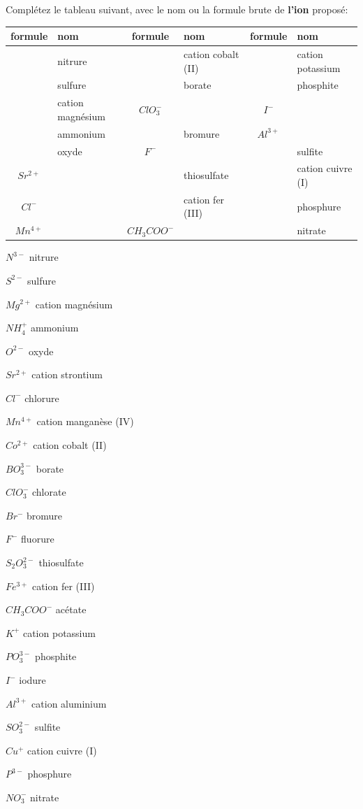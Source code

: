 \documentclass[
  11pt,
  french,
  a4paper,
  openany]{book}
\begin{document}
\begin{Exercise}
Complétez le tableau suivant, avec le nom ou la formule brute de \textbf{l'ion} proposé:

\end{Exercise}

\begin{longtable}[]{@{}clclcl@{}}
\toprule
formule & nom & formule & nom & formule & nom\tabularnewline
\midrule
\endhead
& nitrure & & cation cobalt (II) & & cation potassium\tabularnewline
& sulfure & & borate & & phosphite\tabularnewline
& cation magnésium & \(ClO_3^{-}\) & & \(I^{-}\) &\tabularnewline
& ammonium & & bromure & \(Al^{3+}\) &\tabularnewline
& oxyde & \(F^{-}\) & & & sulfite\tabularnewline
\(Sr^{2+}\) & & & thiosulfate & & cation cuivre (I)\tabularnewline
\(Cl^{-}\) & & & cation fer (III) & & phosphure\tabularnewline
\(Mn^{4+}\) & & \(CH_3COO^{-}\) & & & nitrate\tabularnewline
\bottomrule
\end{longtable}

\begin{Answer}

\begin{multicols}{3}
\(N^{3-}\) nitrure

\(S^{2-}\) sulfure

\(Mg^{2+}\) cation magnésium

\(NH_4^{+}\) ammonium

\(O^{2-}\) oxyde

\(Sr^{2+}\) cation strontium

\(Cl^{-}\) chlorure

\(Mn^{4+}\) cation manganèse (IV)

\(Co^{2+}\) cation cobalt (II)

\(BO_3^{3-}\) borate

\(ClO_3^{-}\) chlorate

\(Br^{-}\) bromure

\(F^{-}\) fluorure

\(S_2O_3^{2-}\) thiosulfate

\(Fe^{3+}\) cation fer (III)

\(CH_3COO^{-}\) acétate

\(K^{+}\) cation potassium

\(PO_3^{3-}\) phosphite

\(I^{-}\) iodure

\(Al^{3+}\) cation aluminium

\(SO_3^{2-}\) sulfite

\(Cu^{+}\) cation cuivre (I)

\(P^{3-}\) phosphure

\(NO_3^{-}\) nitrate

\end{multicols}


\end{Answer}
\end{document}
